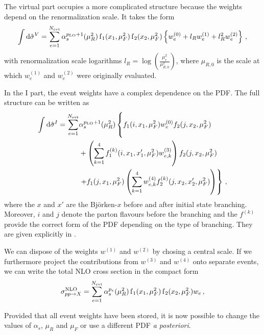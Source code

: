 The virtual part occupies a more complicated structure because the weights depend on the renormalization scale.
It takes the form
%
\begin{equation}
	\int \dif \hat \sigma^V = \sum_{e=1}^{N_\text{evt}} \alpha_s^{p_\text{LO} + 1}(\mu_R^2) \pdf_1(x_1,\mu_F^2) \pdf_2(x_2,\mu_F^2) \left\{ w_e^{(0)} + l_R w_e^{(1)} + l_R^2 w_e^{(2)} \right\} \, ,
\end{equation}
%
with renormalization scale logarithms $l_R = \log\left(\frac{\mu_r^2}{\mu_{R,0}^2} \right)$, where $\mu_{R,0}$ is the scale at which $w_e^{(1)}$ and $w_e^{(2)}$ were originally evaluated.

In the I part, the event weights have a complex dependence on the PDF.
The full structure can be written as
%
\begin{align}
	\int \dif \hat \sigma^I = \sum_{e=1}^{N_\text{evt}} &\alpha_s^{p_\text{LO} + 1}(\mu_R^2) \left\{ \vphantom{\left( \sum_{k=1}^4 \right)} f_1(i,x_1,\mu_F^2) w_e^{(0)} f_2(j,x_2,\mu_F^2) \right. \nonumber \\
								&+ \left( \sum_{k=1}^4 f_1^{(k)}(i,x_1,x'_1,\mu_F^2) w_{e,k}^{(3)} \right) f_2(j,x_2,\mu_F^2) \nonumber \\
								&\left. + f_1(j,x_1,\mu_F^2) \left( \sum_{k=1}^4 w_{e,k}^{(4)} f_2^{(k)}(j,x_2,x'_2,\mu_F^2) \right) \right\} \, ,
\end{align}
%
where the $x$ and $x'$ are the Björken-$x$ before and after initial state branching.
Moreover, $i$ and $j$ denote the parton flavours before the branching and the $f^{(k)}$ provide the correct form of the PDF depending on the type of branching.
They are given explicitly in \cite{mcgrid2013}.

We can dispose of the weights $w^{(1)}$ and $w^{(2)}$ by chosing a central scale.
If we furthermore project the contributions from $w^{(3)}$ and $w^{(4)}$ onto separate events, we can write the total NLO cross section in the compact form
%
\begin{equation}
  \sigma^\text{NLO}_{pp \rightarrow X} = \sum_{e=1}^{N_\text{evt}} \alpha_s^{p_e}(\mu_R^2) \operatorname{f}_1(x_1,\mu_F^2) \operatorname{f}_2(x_2,\mu_F^2) w_e \, ,
  \label{eq:reweight_nlo}
\end{equation}
%

Provided that all event weights have been stored, it is now possible to change the values of $\alpha_s$, $\mu_R$ and $\mu_F$ or use a different PDF \textit{a posteriori}.
%
